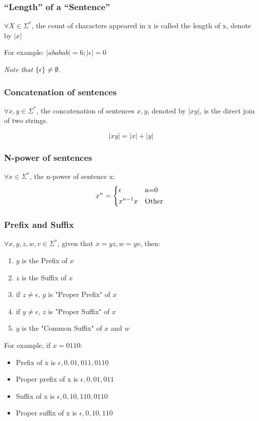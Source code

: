 \documentclass{ctexart}
\DeclarePairedDelimiter{\set}{\{}{\}}
\begin{document}
\subsubsection{``Length'' of a ``Sentence''}

$\forall X \in \Sigma^*$, the count of characters appeared in x is called the length of x, denote by $\left|x\right|$

For example: $\left|ababab\right| = 6; \left|\epsilon\right| = 0$ 

\emph{Note that $\set*{\epsilon} \neq \emptyset$}.

\subsubsection{Concatenation of sentences}
$\forall x, y \in \Sigma^*$, the concatenation of sentences $x, y$, denoted by $|xy|$, is the direct join of two strings.

$$
\left|xy\right| = |x| + |y|
$$

\subsubsection{N-power of sentences}
$\forall x \in \Sigma^*$, the n-power of sentence x:
$$
x^n = \begin{dcases*}
\epsilon & n=0 \\
x^{n-1}x & Other \\
\end{dcases*}
$$

\subsubsection{Prefix and Suffix}
$\forall x,y,z,w,v \in \Sigma^*$, given that $x=yz, w=yv$, then:
\begin{enumerate}
	\item $y$ is the Prefix of $x$
	\item $z$ is the Suffix of $x$
	\item if $z \neq \epsilon$, $y$ is "Proper Prefix" of $x$
	\item if $y \neq \epsilon$, $z$ is "Proper Suffix" of $x$
	\item $y$ is the "Common Suffix" of $x$ and $w$
\end{enumerate}
For example, if $x = 0110$:
\begin{itemize}
	\item Prefix of x is $\epsilon, 0, 01, 011, 0110$
	\item Proper prefix of x is $\epsilon, 0, 01, 011$
	\item Suffix of x is $\epsilon, 0, 10, 110, 0110$
	\item Proper suffix of x is $\epsilon, 0, 10, 110$
\end{itemize}
\end{document}
